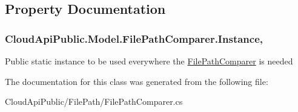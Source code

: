\subsection{Property Documentation}
\hypertarget{class_cloud_api_public_1_1_model_1_1_file_path_comparer_a72c16461590ae2298b139f86689991c8}{
\subsubsection[{Instance}]{ Cloud\-Api\-Public.\-Model.\-File\-Path\-Comparer.\-Instance\hspace{0.3cm}{\ttfamily [static]}, {\ttfamily [get]}}}\label{class_cloud_api_public_1_1_model_1_1_file_path_comparer_a72c16461590ae2298b139f86689991c8}


Public static instance to be used everywhere the \hyperlink{class_cloud_api_public_1_1_model_1_1_file_path_comparer}{File\-Path\-Comparer} is needed 



The documentation for this class was generated from the following file\-:\begin{DoxyCompactItemize}
\item 
Cloud\-Api\-Public/\-File\-Path/File\-Path\-Comparer.\-cs\end{DoxyCompactItemize}
